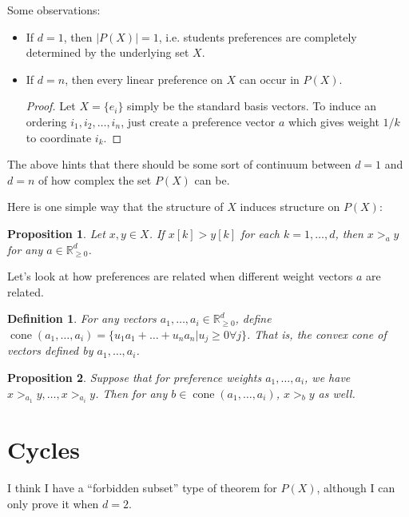 \documentclass[12pt]{article}
\newtheorem*{definition}{Definition}
\newtheorem*{proposition}{Proposition}
\newcommand{\Rgz}{\mathbb{R}_{\ge 0}}
\DeclareMathOperator*{\cone}{cone}
\newcommand{\1}[1]{\mathds{1}[{#1}]}
\begin{document}
  Some observations:
  \begin{itemize}
    \item If $d=1$, then $|P(X)| = 1$, i.e. students preferences are completely
      determined by the underlying set $X$.
    \item If $d=n$, then every linear preference on $X$ can occur in $P(X)$.
      \begin{proof}
        Let $X = \{e_i\}$ simply be the standard basis vectors.
        To induce an ordering $i_1, i_2, \ldots, i_n$, just create a preference
        vector $a$ which gives weight $1/k$ to coordinate $i_k$.
      \end{proof}
  \end{itemize}
  The above hints that there should be some sort of continuum between $d=1$
  and $d=n$ of how complex the set $P(X)$ can be.

  Here is one simple way that the structure of $X$ induces structure on $P(X)$:
  \begin{proposition}
    Let $x,y \in X$. If $x[k] > y[k]$ for each $k=1,\ldots,d$, then
    $x >_a y$ for any $a\in \Rgz^d$.
  \end{proposition}

  Let's look at how preferences are related when different weight vectors $a$
  are related.
  \begin{definition}
    For any vectors $a_1,\ldots, a_i \in \Rgz^d$, define
    $\cone(a_1,\ldots,a_i) = \{ u_1a_1 + \ldots + u_na_n | u_j\ge 0 \forall j\}$.
    That is, the convex cone of vectors defined by $a_1,\ldots,a_i$.
  \end{definition}
  \begin{proposition}
    Suppose that for preference weights $a_1,\ldots, a_i$,
    we have $x >_{a_1} y, \ldots, x >_{a_i} y$.
    Then for any $b\in \cone(a_1,\ldots, a_i)$,
    $x >_b y$ as well.
  \end{proposition}

\section{Cycles}

  I think I have a ``forbidden subset'' type of theorem for
  $P(X)$, although I can only prove it when $d=2$.
\end{document}
